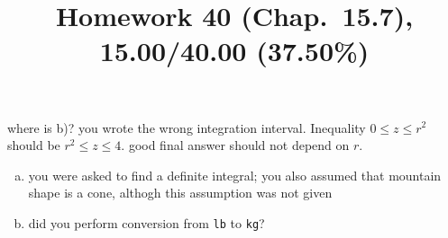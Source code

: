 \documentclass[pstricks,10pt,dvipsnames]{article} %
\title{Homework 40 (Chap.~15.7),
15.00/40.00 (37.50\%)
}
\begin{document}
\maketitle
{}
where is b)?
you wrote the wrong integration interval. Inequality $0\le z\le r^2$ should be $r^2\le z\le 4$.
good
final answer should not depend on $r$.
\begin{enumerate}[(a)]
	\item you were asked to find a definite integral; you also assumed that
		mountain shape is a cone, althogh this assumption was not given
	\item did you perform conversion from \texttt{lb} to \texttt{kg}?
\end{enumerate}
\end{document}
